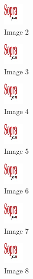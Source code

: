\begin{figure}[!h]
  \center
  \includegraphics[width=1cm]{img/test.jpg}
  \caption{Image 2}
\end{figure}

\begin{figure}[!h]
  \center
  \includegraphics[width=1cm]{img/test.jpg}
  \caption{Image 3}
\end{figure}

\begin{figure}[!h]
  \center
  \includegraphics[width=1cm]{img/test.jpg}
  \caption{Image 4}
\end{figure}

\begin{figure}[!h]
  \center
  \includegraphics[width=1cm]{img/test.jpg}
  \caption{Image 5}
\end{figure}

\begin{figure}[!h]
  \center
  \includegraphics[width=1cm]{img/test.jpg}
  \caption{Image 6}
\end{figure}

\begin{figure}[!h]
  \center
  \includegraphics[width=1cm]{img/test.jpg}
  \caption{Image 7}
\end{figure}

\begin{figure}[!h]
  \center
  \includegraphics[width=1cm]{img/test.jpg}
  \caption{Image 8}
\end{figure}


